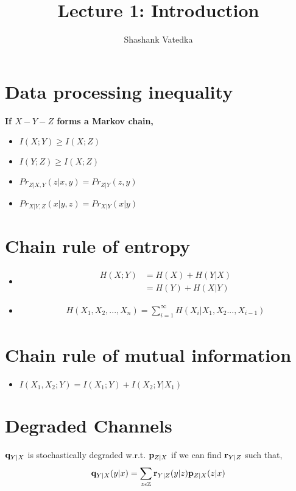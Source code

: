 \documentclass{article}
\title{Lecture 1: Introduction}
\author{Shashank Vatedka}
\begin{document}

\section{Data processing inequality}

\textbf{If $X-Y-Z$ forms a Markov chain,}
\begin{itemize}
    \item $I(X;Y) \geq I(X;Z)$
    \item $I(Y;Z) \geq I(X;Z)$
    \item $Pr_{Z|X,Y}(z|x,y) = Pr_{Z|Y}(z,y)$
    \item $Pr_{X|Y,Z}(x|y,z) = Pr_{X|Y}(x|y)$
\end{itemize} 

\section{Chain rule of entropy}
\begin{itemize}
    \item \begin{align}
        H(X;Y) & = H(X) + H(Y|X) \\
            & = H(Y) + H(X|Y)
    \end{align}
    \item \begin{align}H(X_1, X_2, ... ,X_n) = \sum_{i=1}^{\infty} H(X_i|X_1, X_2 ... , X_{i-1})\end{align}
\end{itemize}

\section{Chain rule of mutual information}
\begin{itemize}
    \item $I(X_1, X_2; Y) = I(X_1; Y) + I(X_2; Y| X_1)$
\end{itemize}


\section{Degraded Channels}

$\mathbf q_{Y|X}$ is stochastically degraded w.r.t. $\mathbf p_{Z|X}$ if we can find $\mathbf r_{Y|Z}$ such that,
    $$\mathbf q_{Y|X}(y|x) = \sum_{z \epsilon \mathbb Z} \mathbf r_{Y|Z}(y|z)\mathbf p_{Z|X}(z|x)$$
\end{document}
